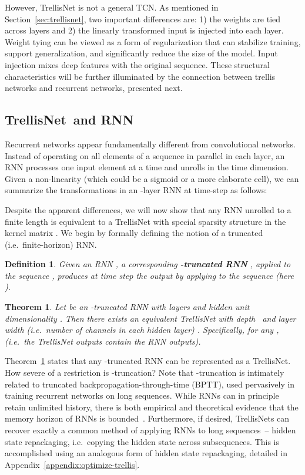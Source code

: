 \documentclass{article} \usepackage{iclr2019_conference,times}
\newcommand{\model}{TrellisNet}
\newtheorem{theorem}{Theorem}
\newtheorem{definition}{Definition}
\begin{document}
However, TrellisNet is not a general TCN. As mentioned in Section~\ref{sec:trellisnet}, two important differences are: 1) the weights are tied across layers and 2) the linearly transformed input  is injected into each layer. Weight tying can be viewed as a form of regularization that can stabilize training, support generalization, and significantly reduce the size of the model. Input injection mixes deep features with the original sequence. These structural characteristics will be further illuminated by the connection between trellis networks and recurrent networks, presented next.

\subsection{\model~and RNN}
\label{subsec:trellis-rnn}

Recurrent networks appear fundamentally different from convolutional networks. Instead of operating on all elements of a sequence in parallel in each layer, an RNN processes one input element at a time and unrolls in the time dimension. Given a non-linearity  (which could be a sigmoid or a more elaborate cell), we can summarize the transformations in an -layer RNN at time-step  as follows:

Despite the apparent differences, we will now show that any RNN unrolled to a finite length is equivalent to a TrellisNet with special sparsity structure in the kernel matrix .
We begin by formally defining the notion of a truncated (i.e.\ finite-horizon) RNN.

\begin{definition}
\label{dfn:unrolled-rnn}
Given an RNN , a corresponding \emph{\textbf{-truncated RNN}} , applied to the sequence , produces at time step  the output  by applying  to the sequence  (here ).
\end{definition}
\vspace{.05in}

\begin{theorem}
\label{thm:trellisnet-rnn}
Let  be an -truncated RNN with  layers and hidden unit dimensionality . Then there exists an equivalent TrellisNet  with depth \small\normalsize\ and layer width (i.e.\ number of channels in each hidden layer) . Specifically, for any ,  (i.e.\ the TrellisNet outputs contain the RNN outputs).
\end{theorem}

Theorem~\ref{thm:trellisnet-rnn} states that any -truncated RNN can be represented as a TrellisNet. How severe of a restriction is -truncation? Note that -truncation is intimately related to truncated backpropagation-through-time (BPTT), used pervasively in training recurrent networks on long sequences. While RNNs can in principle retain unlimited history, there is both empirical and theoretical evidence that the memory horizon of RNNs is bounded~\citep{bai2018empirical,khandelwal2018sharp,miller2018recurrent}.
Furthermore, if desired, TrellisNets can recover exactly a common method of applying RNNs to long sequences~-- hidden state repackaging, i.e.\ copying the hidden state across subsequences. This is accomplished using an analogous form of hidden state repackaging, detailed in Appendix~\ref{appendix:optimize-trellis}.
\end{document}
